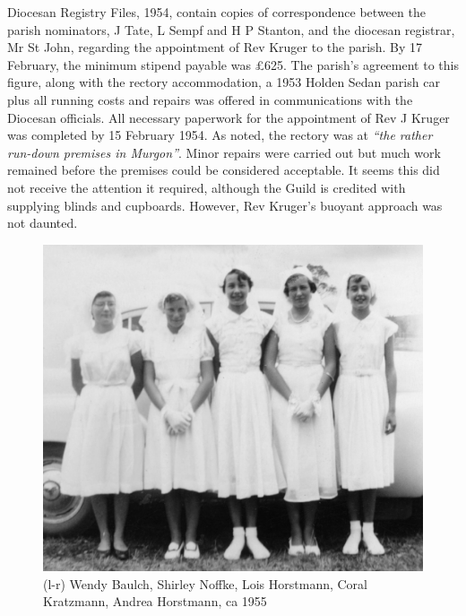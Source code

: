 Diocesan Registry Files, 1954, contain copies of correspondence between the parish nominators, J Tate, L Sempf and H P Stanton, and the diocesan registrar, Mr St John, regarding the appointment of Rev Kruger to the parish. By 17 February, the minimum stipend payable was \pounds625. The parish's agreement to this figure, along with the rectory accommodation, a 1953 Holden Sedan parish car plus all running costs and repairs was offered in communications with the Diocesan officials. All necessary paperwork for the appointment of Rev J Kruger was completed by 15 February 1954. As noted, the rectory was at \emph{``the rather run-down premises in Murgon''}. Minor repairs were carried out but much work remained before the premises could be considered acceptable. It seems this did not receive the attention it required, although the Guild is credited with supplying blinds and cupboards. However, Rev Kruger's buoyant approach was not daunted.









\begin{figure}[!htb]
\begin{center}
\includegraphics[width=1.\textwidth,center]{../images/confirmation1955.jpg}
\caption{(l-r) Wendy Baulch, Shirley Noffke, Lois Horstmann, Coral Kratzmann, Andrea Horstmann, ca 1955}
\end{center}
\end{figure}




